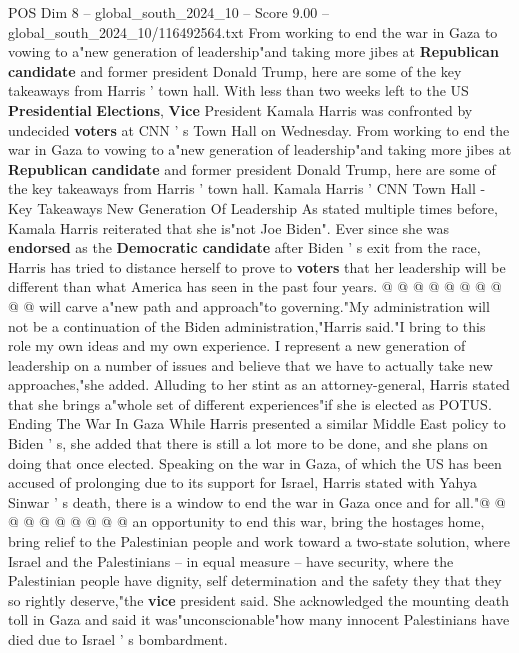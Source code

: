 \begin{textsample}{POS Dim 8 – global\_south\_2024\_10 – Score 9.00 – global\_south\_2024\_10/116492564.txt}  \label{ex:f8_pos_268}
From working to end the war in Gaza to vowing to a"new generation of leadership"and taking more jibes at \textbf{Republican} \textbf{candidate} and former president Donald Trump, here are some of the key takeaways from Harris ' town hall.
With less than two weeks left to the US \textbf{Presidential} \textbf{Elections}, \textbf{Vice} President Kamala Harris was confronted by undecided \textbf{voters} at CNN ' s Town Hall on Wednesday.
From working to end the war in Gaza to vowing to a"new generation of leadership"and taking more jibes at \textbf{Republican} \textbf{candidate} and former president Donald Trump, here are some of the key takeaways from Harris ' town hall.
Kamala Harris ' CNN Town Hall - Key Takeaways New Generation Of Leadership As stated multiple times before, Kamala Harris reiterated that she is"not Joe Biden".
Ever since she was \textbf{endorsed} as the \textbf{Democratic} \textbf{candidate} after Biden ' s exit from the race, Harris has tried to distance herself to prove to \textbf{voters} that her leadership will be different than what America has seen in the past four years. @ @ @ @ @ @ @ @ @ @ will carve a"new path and approach"to governing."My administration will not be a continuation of the Biden administration,"Harris said."I bring to this role my own ideas and my own experience.
I represent a new generation of leadership on a number of issues and believe that we have to actually take new approaches,"she added.
Alluding to her stint as an attorney-general, Harris stated that she brings a"whole set of different experiences"if she is elected as POTUS.
Ending The War In Gaza While Harris presented a similar Middle East policy to Biden ' s, she added that there is still a lot more to be done, and she plans on doing that once elected.
Speaking on the war in Gaza, of which the US has been accused of prolonging due to its support for Israel, Harris stated with Yahya Sinwar ' s death, there is a window to end the war in Gaza once and for all."@ @ @ @ @ @ @ @ @ @ an opportunity to end this war, bring the hostages home, bring relief to the Palestinian people and work toward a two-state solution, where Israel and the Palestinians -- in equal measure -- have security, where the Palestinian people have dignity, self determination and the safety they that they so rightly deserve,"the \textbf{vice} president said.
She acknowledged the mounting death toll in Gaza and said it was"unconscionable"how many innocent Palestinians have died due to Israel ' s bombardment.

\end{textsample}
